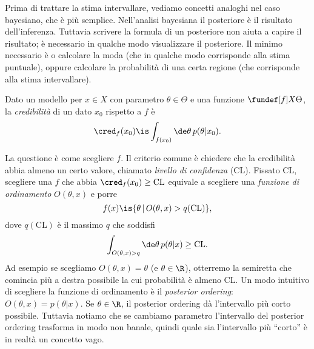 Prima di trattare la stima intervallare,
vediamo concetti analoghi nel caso bayesiano,
che è più semplice.
Nell'analisi bayesiana il posteriore è il risultato dell'inferenza.
Tuttavia scrivere la formula di un posteriore non aiuta a capire il risultato;
è necessario in qualche modo visualizzare il posteriore.
Il minimo necessario è o calcolare la moda
(che in qualche modo corrisponde alla stima puntuale),
oppure calcolare la probabilità di una certa regione (che corrisponde alla stima intervallare).
\begin{definition}[Credibilità]
	\label{th:cred}
	Dato un modello per $x\in X$ con parametro $\theta\in\Theta$
	e una funzione $\fundef[f]X\Theta$,
	la \emph{credibilità} di un dato $x_0$ rispetto a $f$ è
	\begin{equation*}
		\cred_f(x_0)
		\is \int_{f(x_0)} \de \theta\, p(\theta|x_0).
	\end{equation*}
\end{definition}
La questione è come scegliere $f$.
Il criterio comune è chiedere che la credibilità abbia almeno un certo valore,
chiamato \emph{livello di confidenza} (CL).
Fissato CL, scegliere una $f$ che abbia $\cred_f(x_0)\ge\mathrm{CL}$
equivale a scegliere una \emph{funzione di ordinamento} $O(\theta,x)$ e porre
\begin{equation*}
	f(x) \is \{\theta\,|\,O(\theta,x)>q(\mathrm{CL})\},
\end{equation*}
dove $q(\mathrm{CL})$ è il massimo $q$ che soddisfi
\begin{equation*}
	\int_{O(\theta,x)>q} \de\theta\, p(\theta|x) \ge \mathrm{CL}.
\end{equation*}
Ad esempio se scegliamo $O(\theta,x)=\theta$ (e $\theta\in\R$),
otterremo la semiretta che comincia più a destra possibile la cui probabilità è almeno CL.
Un modo intuitivo di scegliere la funzione di ordinamento è il \emph{posterior ordering}:
$O(\theta,x) = p(\theta|x)$.
Se $\theta\in\R$, il posterior ordering dà l'intervallo più corto possibile.
Tuttavia notiamo che se cambiamo parametro l'intervallo del posterior ordering trasforma in modo non banale,
quindi quale sia l'intervallo più ``corto'' è in realtà un concetto vago.

